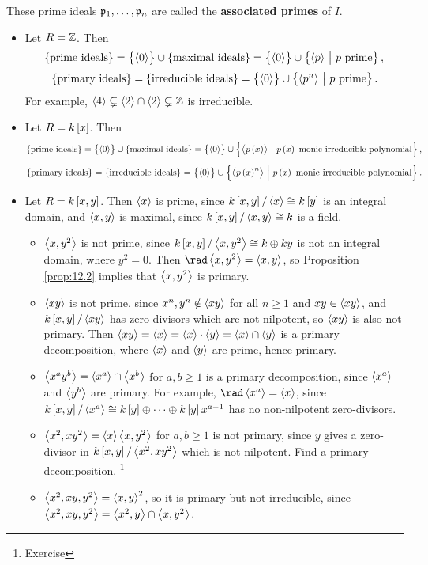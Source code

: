 \begin{remark*}
These prime ideals $ \mathfrak{p}_1, \dots, \mathfrak{p}_n $ are called the \textbf{associated primes} of $ I $.
\end{remark*}

\begin{example*}
\hfill
\begin{itemize}
\item Let $ R = \mathbb{Z} $. Then
$$ \cbr{\text{prime ideals}} = \cbr{\abr{0}} \cup \cbr{\text{maximal ideals}} = \cbr{\abr{0}} \cup \cbr{\abr{p} \st p \ \text{prime}}, $$
$$ \cbr{\text{primary ideals}} = \cbr{\text{irreducible ideals}} = \cbr{\abr{0}} \cup \cbr{\abr{p^n} \st p \ \text{prime}}. $$
For example, $ \left\langle 4 \right\rangle \subsetneq \left\langle 2 \right\rangle \cap \left\langle 2 \right\rangle \subsetneq \mathbb{Z} $ is irreducible.
\item Let $ R = k\sbr{x} $. Then
$$ \cbr{\text{prime ideals}} = \cbr{\abr{0}} \cup \cbr{\text{maximal ideals}} = \cbr{\abr{0}} \cup \cbr{\abr{p\br{x}} \st p\br{x} \ \text{monic irreducible polynomial}}, $$
$$ \cbr{\text{primary ideals}} = \cbr{\text{irreducible ideals}} = \cbr{\abr{0}} \cup \cbr{\abr{p\br{x}^n} \st p\br{x} \ \text{monic irreducible polynomial}}. $$
\item Let $ R = k\sbr{x, y} $. Then $ \left\langle x \right\rangle $ is prime, since $ k\sbr{x, y} / \abr{x} \cong k\sbr{y} $ is an integral domain, and $ \left\langle x, y \right\rangle $ is maximal, since $ k\sbr{x, y} / \abr{x, y} \cong k $ is a field.
\begin{itemize}
\item $ \left\langle x, y^2 \right\rangle $ is not prime, since $ k\sbr{x, y} / \abr{x, y^2} \cong k \oplus ky $ is not an integral domain, where $ y^2 = 0 $. Then $ \rad \abr{x, y^2} = \abr{x, y} $, so Proposition \ref{prop:12.2} implies that $ \left\langle x, y^2 \right\rangle $ is primary.
\item $ \left\langle xy \right\rangle $ is not prime, since $ x^n, y^n \notin \left\langle xy \right\rangle $ for all $ n \ge 1 $ and $ xy \in \left\langle xy \right\rangle $, and $ k\sbr{x, y} / \abr{xy} $ has zero-divisors which are not nilpotent, so $ \left\langle xy \right\rangle $ is also not primary. Then $ \left\langle xy \right\rangle = \left\langle x \right\rangle = \left\langle x \right\rangle \cdot \left\langle y \right\rangle = \left\langle x \right\rangle \cap \left\langle y \right\rangle $ is a primary decomposition, where $ \left\langle x \right\rangle $ and $ \left\langle y \right\rangle $ are prime, hence primary.
\item $ \left\langle x^ay^b \right\rangle = \left\langle x^a \right\rangle \cap \left\langle x^b \right\rangle $ for $ a, b \ge 1 $ is a primary decomposition, since $ \left\langle x^a \right\rangle $ and $ \left\langle y^b \right\rangle $ are primary. For example, $ \rad \abr{x^a} = \abr{x} $, since $ k\sbr{x, y} / \abr{x^a} \cong k\sbr{y} \oplus \dots \oplus k\sbr{y}x^{a - 1} $ has no non-nilpotent zero-divisors.
\item $ \left\langle x^2, xy^2 \right\rangle = \left\langle x \right\rangle\left\langle x, y^2 \right\rangle $ for $ a, b \ge 1 $ is not primary, since $ y $ gives a zero-divisor in $ k\sbr{x, y} / \abr{x^2, xy^2} $ which is not nilpotent. Find a primary decomposition. \footnote{Exercise}
\item $ \left\langle x^2, xy, y^2 \right\rangle = \left\langle x, y \right\rangle^2 $, so it is primary but not irreducible, since $ \left\langle x^2, xy, y^2 \right\rangle = \left\langle x^2, y \right\rangle \cap \left\langle x, y^2 \right\rangle $.
\end{itemize}
\end{itemize}
\end{example*}

